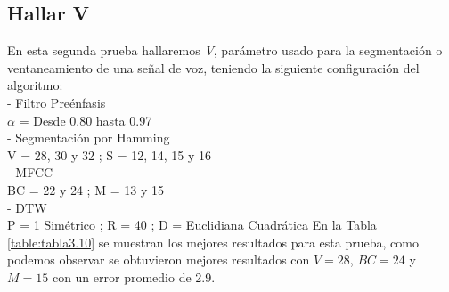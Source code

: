 \subsection{Hallar V}
En esta segunda prueba hallaremos \textit{V}, parámetro usado para la segmentación o ventaneamiento de una señal de voz, teniendo la siguiente configuración del algoritmo:\\
- Filtro Preénfasis \\
\hspace*{1cm} $\alpha$ = Desde 0.80 hasta 0.97 \\
- Segmentación por Hamming \\
\hspace*{1cm} V = 28, 30 y 32 ; \qquad S = 12, 14, 15 y 16 \\
- MFCC \\
\hspace*{1cm} BC = 22 y 24 ; \qquad M = 13 y 15 \\
- DTW \\
\hspace*{1cm} P = 1 Simétrico ; \qquad R = 40 ; \qquad D = Euclidiana Cuadrática
\vskip 0.5cm
En la Tabla \ref{table:tabla3.10} se muestran los mejores resultados para esta prueba, como podemos observar se obtuvieron mejores resultados con $V = 28$, $BC = 24$ y $M = 15$ con un error promedio de 2.9.
